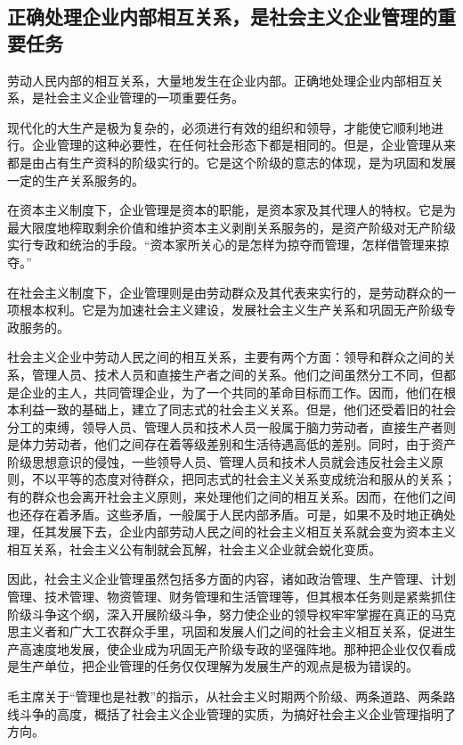 \documentclass{book}
\begin{document}
\subsection{正确处理企业内部相互关系，是社会主义企业管理的重要任务}

劳动人民内部的相互关系，大量地发生在企业内部。正确地处理企业内部相互关系，是社会主义企业管理的一项重要任务。

现代化的大生产是极为复杂的，必须进行有效的组织和领导，才能使它顺利地进行。企业管理的这种必要性，在任何社会形态下都是相同的。但是，企业管理从来都是由占有生产资科的阶级实行的。它是这个阶级的意志的体现，是为巩固和发展一定的生产关系服务的。

在资本主义制度下，企业管理是资本的职能，是资本家及其代理人的特权。它是为最大限度地榨取剩余价值和维护资本主义剥削关系服务的，是资产阶级对无产阶级实行专政和统治的手段。“资本家所关心的是怎样为掠夺而管理，怎样借管理来掠夺。”

在社会主义制度下，企业管理则是由劳动群众及其代表来实行的，是劳动群众的一项根本权利。它是为加速社会主义建设，发展社会主义生产关系和巩固无产阶级专政服务的。

社会主义企业中劳动人民之间的相互关系，主要有两个方面：领导和群众之间的关系，管理人员、技术人员和直接生产者之间的关系。他们之间虽然分工不同，但都是企业的主人，共同管理企业，为了一个共同的革命目标而工作。因而，他们在根本利益一致的基础上，建立了同志式的社会主义关系。但是，他们还受着旧的社会分工的束缚，领导人员、管理人员和技术人员一般属于脑力劳动者，直接生产者则是体力劳动者，他们之间存在着等级差别和生活待遇高低的差别。同时，由于资产阶级思想意识的侵蚀，一些领导人员、管理人员和技术人员就会违反社会主义原则，不以平等的态度对待群众，把同志式的社会主义关系变成统治和服从的关系；有的群众也会离开社会主义原则，来处理他们之间的相互关系。因而，在他们之间也还存在着矛盾。这些矛盾，一般属于人民内部矛盾。可是，如果不及时地正确处理，任其发展下去，企业内部劳动人民之间的社会主义相互关系就会变为资本主义相互关系，社会主义公有制就会瓦解，社会主义企业就会蜕化变质。

因此，社会主义企业管理虽然包括多方面的内容，诸如政治管理、生产管理、计划管理、技术管理、物资管理、财务管理和生活管理等，但其根本任务则是紧紫抓住阶级斗争这个纲，深入开展阶级斗争，努力使企业的领导权牢牢掌握在真正的马克思主义者和广大工农群众手里，巩固和发展人们之间的社会主义相互关系，促进生产高速度地发展，使企业成为巩固无产阶级专政的坚强阵地。那种把企业仅仅看成是生产单位，把企业管理的任务仅仅理解为发展生产的观点是极为错误的。

毛主席关于“管理也是社教”的指示，从社会主义时期两个阶级、两条道路、两条路线斗争的高度，概括了社会主义企业管理的实质，为搞好社会主义企业管理指明了方向。
\end{document}
